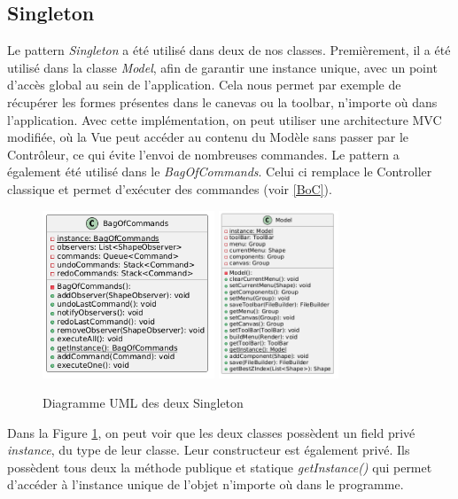 \documentclass{article}
\begin{document}
\subsection{Singleton}

Le pattern \textit{Singleton} a été utilisé dans deux de nos classes. Premièrement, il a été utilisé dans la classe \textit{Model}, 
afin de garantir une instance unique, avec un point d'accès global au sein de l'application.
Cela nous permet par exemple de récupérer les formes présentes dans le canevas ou la toolbar, n'importe où dans l'application. Avec cette implémentation,
on peut utiliser une architecture MVC modifiée, où la Vue peut accéder au contenu du Modèle sans passer par le Contrôleur, ce qui évite l'envoi
de nombreuses commandes.
Le pattern a également été utilisé dans le \textit{BagOfCommands}. Celui ci remplace le Controller classique et permet d'exécuter des commandes (voir \ref{BoC}).

\begin{figure}[h]
    \centering
    \includegraphics[width=\textwidth,height=5.0cm,keepaspectratio]{singleton.png}
    \includegraphics[width=\textwidth,height=5.0cm,keepaspectratio]{singleton2.png}
    \caption{Diagramme UML des deux Singleton}
    \label{Singleton}
\end{figure}
\FloatBarrier

Dans la Figure \ref{Singleton}, on peut voir que les deux classes possèdent un field privé \textit{instance}, du type de leur classe.
Leur constructeur est également privé. Ils possèdent tous deux la méthode publique et statique \textit{getInstance()} qui permet
d'accéder à l'instance unique de l'objet n'importe où dans le programme.
\end{document}
